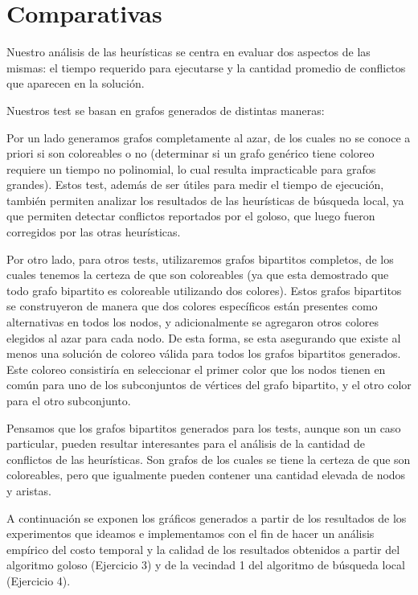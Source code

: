 \newpage
\section{Comparativas}
Nuestro análisis de las heurísticas se centra en evaluar dos aspectos de las mismas: el tiempo requerido para ejecutarse y la cantidad promedio de conflictos que aparecen en la solución.


Nuestros test se basan en grafos generados de distintas maneras:

Por un lado generamos grafos completamente al azar, de los cuales no se conoce a priori si son coloreables o no (determinar si un grafo genérico tiene coloreo requiere un tiempo no polinomial, lo cual resulta impracticable para grafos grandes). Estos test, además de ser útiles para medir el tiempo de ejecución, también permiten analizar los resultados de las heurísticas de búsqueda local, ya que permiten detectar conflictos reportados por el goloso, que luego fueron corregidos por las otras heurísticas.

Por otro lado, para otros tests, utilizaremos grafos bipartitos completos, de los cuales tenemos la certeza de que son coloreables (ya que esta demostrado que todo grafo bipartito es coloreable utilizando dos colores). Estos grafos bipartitos se construyeron de manera que dos colores específicos están presentes como alternativas en todos los nodos,  y adicionalmente se agregaron otros colores elegidos al azar para cada nodo. De esta forma, se esta asegurando que existe al menos una solución de coloreo válida para todos los grafos bipartitos generados. Este coloreo consistiría en seleccionar el primer color que los nodos tienen en común para uno de los subconjuntos de vértices del grafo bipartito, y el otro color para el otro subconjunto.

Pensamos que los grafos bipartitos generados para los tests, aunque son un caso particular, pueden resultar interesantes para el análisis de la cantidad de conflictos de las heurísticas. Son grafos de los cuales se tiene la certeza de que son coloreables, pero que igualmente pueden contener una cantidad elevada de nodos y aristas.

A continuación se exponen los gráficos generados a partir de los resultados de los experimentos que ideamos e implementamos con el fin de hacer un análisis empírico del costo temporal y la calidad de los resultados obtenidos a partir del algoritmo goloso (Ejercicio 3) y de la vecindad 1 del algoritmo de búsqueda local (Ejercicio 4).

